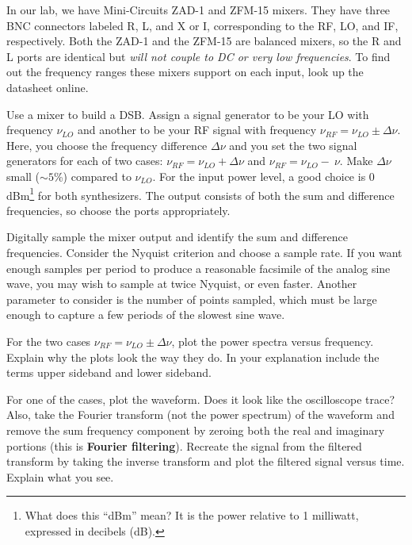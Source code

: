 \documentclass[11pt,preprint]{aastex}
\begin{document}
In our lab, we have Mini-Circuits ZAD-1 and ZFM-15 mixers. 
They have three BNC connectors
labeled R, L, and X or I, corresponding to
the RF, LO, and IF, respectively.
Both the ZAD-1 and the ZFM-15 are
balanced mixers, so the R and L ports are identical but
{\it will not couple to DC or very low frequencies}.  To find out
the frequency ranges these mixers support on each input, 
look up the datasheet online. 


Use a mixer to build a DSB.
Assign a signal generator to
be your LO with frequency $\nu_{LO}$ and
another to be your RF signal with frequency $\nu_{RF} = \nu_{LO} \pm
\Delta \nu$.  Here, you choose the frequency difference $\Delta \nu$ and
you set the two signal generators 
for each of two cases:
$\nu_{RF} = \nu_{LO} + \Delta \nu$ and $\nu_{RF} = \nu_{LO} - \
\nu$.  Make $\Delta \nu$ small ($\sim5$\%) compared to $\nu_{LO}$.
For the input power level, a good choice is 0
dBm\footnote{What does this ``dBm'' mean? It is the power relative to 1
  milliwatt, expressed in decibels (dB).}
  for both synthesizers. The output consists of both the
sum and difference frequencies, so choose the ports appropriately.

Digitally sample the mixer output and identify the
sum and difference frequencies.
Consider
the Nyquist criterion and choose a sample rate. If you want enough samples per period to
produce a reasonable facsimile of the analog sine wave,
you may wish to sample at twice
Nyquist, or even faster.  Another parameter to consider is the number of points
sampled, which must be large enough to capture a few
periods of the slowest sine wave.

For the two cases $\nu_{RF} = \nu_{LO} \pm \Delta \nu$, plot the power
spectra versus frequency. Explain why the plots look the way they do. In
your explanation include the terms upper sideband and lower
sideband.

For one of the cases, plot the waveform.  Does it look like the
oscilloscope trace? Also, take the Fourier transform (not the power
spectrum) of the waveform and remove the sum frequency component by
zeroing both the real and imaginary portions (this is {\bf Fourier
filtering}).  Recreate the signal from the filtered transform by taking
the inverse transform and plot the filtered signal versus time.  Explain
what you see.
\end{document}
